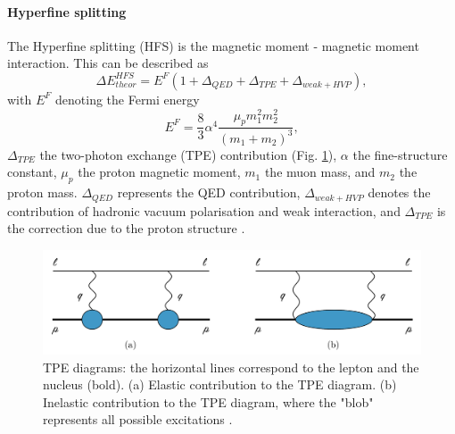 \documentclass[12pt]{article}
\begin{document}
\paragraph{Hyperfine splitting}
The Hyperfine splitting (HFS) is the magnetic moment - magnetic moment interaction. This can be described \cite{proposal} as
\begin{equation}
\Delta{E}^{HFS}_{theor} = E^F(1 + {\Delta}_{QED} + {\Delta}_{TPE} + {\Delta}_{weak + HVP}),
\end{equation}
with $E^F$ denoting the Fermi energy
\begin{equation}
E^F = \frac{8}{3}{\alpha}^4 \frac{{\mu}_p{m_1^2}{m_2^2}}{(m_1+m_2)^3},
\end{equation}
${\Delta}_{TPE}$ the two-photon exchange (TPE) contribution (Fig. \ref{fig:tpediagram}), $\alpha$ the fine-structure constant, ${\mu}_p$ the proton magnetic moment, $m_1$ the muon mass, and $m_2$ the proton mass. ${\Delta}_{QED}$ represents the QED contribution, ${\Delta}_{weak+HVP}$ denotes the contribution of hadronic vacuum polarisation and weak interaction, and ${\Delta}_{TPE}$ is the correction due to the proton structure \cite{martynenko}.
\begin{figure}[h]
\centering
\includegraphics[width=1.0\textwidth]{img/tpediagramms}
\caption{TPE diagrams: the horizontal lines correspond to the lepton and the nucleus (bold). (a) Elastic contribution to the TPE diagram. (b) Inelastic contribution to the TPE diagram, where the "blob" represents all possible excitations \cite{franziska}.}
\label{fig:tpediagram}
\end{figure} 
\end{document}
